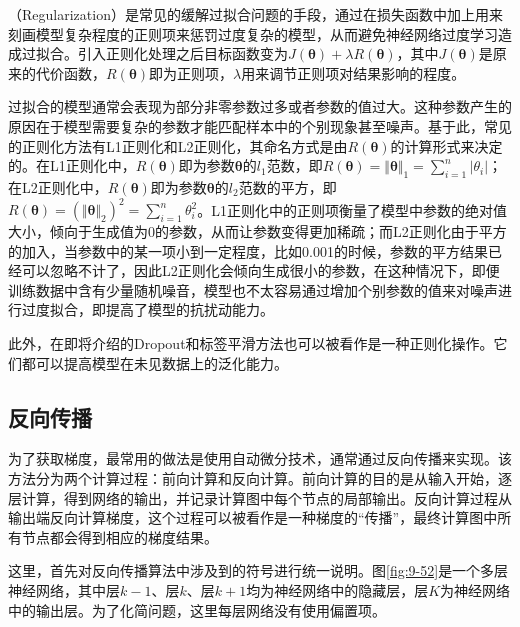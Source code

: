 （Regularization）是常见的缓解过拟合问题的手段，通过在损失函数中加上用来刻画模型复杂程度的正则项来惩罚过度复杂的模型，从而避免神经网络过度学习造成过拟合。引入正则化处理之后目标函数变为$ J({\bm \theta})+\lambda R({\bm \theta}) $，其中$ J({\bm \theta}) $是原来的代价函数，$ R({\bm \theta}) $即为正则项，$ \lambda $用来调节正则项对结果影响的程度。

\parinterval  过拟合的模型通常会表现为部分非零参数过多或者参数的值过大。这种参数产生的原因在于模型需要复杂的参数才能匹配样本中的个别现象甚至噪声。基于此，常见的正则化方法有L1正则化和L2正则化，其命名方式是由$ R({\bm \theta}) $的计算形式来决定的。在L1正则化中，$ R({\bm \theta}) $即为参数$ {\bm \theta} $的$ l_1 $范数，即$ R({\bm \theta}) ={\Vert {\bm \theta}\Vert}_1=\sum\limits_{i=1}^{n}{\vert \theta_i\vert} $；在L2正则化中，$ R(\bm \theta) $即为参数${\bm \theta} $的$ l_2 $范数的平方，即$ R(\bm \theta) =({\Vert {\bm \theta}\Vert}_2)^2=\sum\limits_{i=1}^{n}{\theta_i^2} $。L1正则化中的正则项衡量了模型中参数的绝对值大小，倾向于生成值为0的参数，从而让参数变得更加稀疏；而L2正则化由于平方的加入，当参数中的某一项小到一定程度，比如0.001的时候，参数的平方结果已经可以忽略不计了，因此L2正则化会倾向生成很小的参数，在这种情况下，即便训练数据中含有少量随机噪音，模型也不太容易通过增加个别参数的值来对噪声进行过度拟合，即提高了模型的抗扰动能力。

\parinterval  此外，在{\chaptertwelve}即将介绍的Dropout和标签平滑方法也可以被看作是一种正则化操作。它们都可以提高模型在未见数据上的泛化能力。


\subsection{反向传播}\label{sec:9.4.6}

\parinterval  为了获取梯度，最常用的做法是使用自动微分技术，通常通过反向传播来实现。该方法分为两个计算过程：前向计算和反向计算。前向计算的目的是从输入开始，逐层计算，得到网络的输出，并记录计算图中每个节点的局部输出。反向计算过程从输出端反向计算梯度，这个过程可以被看作是一种梯度的“传播”，最终计算图中所有节点都会得到相应的梯度结果。

\parinterval  这里，首先对反向传播算法中涉及到的符号进行统一说明。图\ref{fig:9-52}是一个多层神经网络，其中层$ k-1 $、层$ k $、层$ k+1 $均为神经网络中的隐藏层，层$ K $为神经网络中的输出层。为了化简问题，这里每层网络没有使用偏置项。

